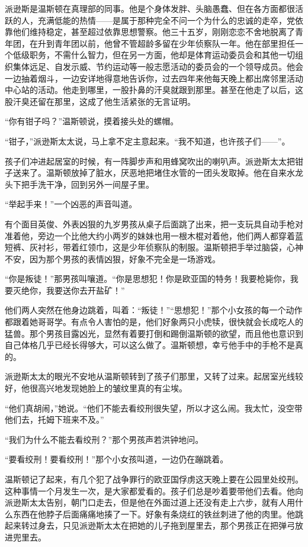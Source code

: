 派逊斯是温斯顿在真理部的同事。他是个身体发胖、头脑愚蠢、但在各方面都很活跃的人，充满低能的热情——是属于那种完全不问一个为什么的忠诚的走卒，党依靠他们维持稳定，甚至超过依靠思想警察。他三十五岁，刚刚恋恋不舍地脱离了青年团，在升到青年团以前，他曾不管超龄多留在少年侦察队一年。他在部里担任一个低级职务，不需什么智力，但在另一方面，他却是体育运动委员会和其他一切组织集体远足、自发示威、节约运动等一般志愿活动的委员会的一个领导成员。他会一边抽着烟斗，一边安详地得意地告诉你，过去四年来他每天晚上都出席邻里活动中心站的活动。他走到哪里，一股扑鼻的汗臭就跟到那里。甚至在他走了以后，这股汗臭还留在那里，这成了他生活紧张的无言证明。


“你有钳子吗？”温斯顿说，摸着接头处的螺帽。


“钳子，”派逊斯太太说，马上拿不定主意起来。“我不知道，也许孩子们——”。


孩子们冲进起居室的时候，有一阵脚步声和用蜂窝吹出的喇叭声。派逊斯太太把钳子送来了。温斯顿放掉了脏水，厌恶地把堵住水管的一团头发取掉。他在自来水龙头下把手洗干净，回到另外一间屋子里。


“举起手来！”一个凶恶的声音叫道。


有个面目英俊、外表凶狠的九岁男孩从桌子后面跳了出来，把一支玩具自动手枪对准着他，旁边一个比他大约小两岁的妹妹也用一根木棍对着他，他们两人都穿着蓝短裤、灰衬衫，带着红领巾，这是少年侦察队的制服。温斯顿把手举过脑袋，心神不安，因为那个男孩的表情凶狠，好象不完全是一场游戏。


“你是叛徒！”那男孩叫嚷道。“你是思想犯！你是欧亚国的特务！我要枪毙你，我要灭绝你，我要送你去开盐矿！”


他们两人突然在他身边跳着，叫着：“叛徒！”“思想犯！”那个小女孩的每一个动作都跟着她哥哥学。有点令人害怕的是，他们好象两只小虎犊，很快就会长成吃人的猛兽。那个男孩目露凶光，显然有着要打倒和踢倒温斯顿的欲望，而且他也意识到自己体格几乎已经长得够大，可以这么做了。温斯顿想，幸亏他手中的手枪不是真的。


派逊斯太太的眼光不安地从温斯顿转到了孩子们那里，又转了过来。起居室光线较好，他很高兴地发现她脸上的皱纹里真的有尘埃。


“他们真胡闹，”她说。“他们不能去看绞刑很失望，所以才这么闹。我太忙，没空带他们去，托姆下班来不及。”


“我们为什么不能去看绞刑？”那个男孩声若洪钟地问。


“要看绞刑！要看绞刑！”那个小女孩叫道，一边仍在蹦跳着。


温斯顿记了起来，有几个犯了战争罪行的欧亚国俘虏这天晚上要在公园里处绞刑。这种事情一个月发生一次，是大家都爱看的。孩子们总是吵着要带他们去看。他向派逊斯太太告别，朝门口走去，但是他在外面过道上还没有走上六步，就有人用什么东西在他脖子后面痛痛地揍了一下。好象有条烧红的铁丝刺进了他的肉里。他跳起来转过身去，只见派逊斯太太在把她的儿子拖到屋里去，那个男孩正在把弹弓放进兜里去。


